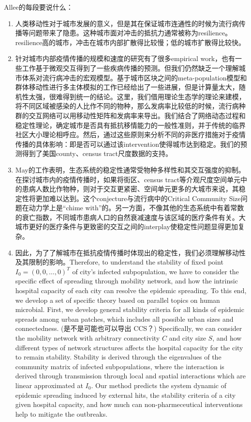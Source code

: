 Allee的每段要说什么：\begin{enumerate}
    \item 人类移动性对于城市发展的意义，但是其在保证城市连通性的时候为流行病传播等问题带来了隐患。这种城市面对冲击的抵抗力通常被称为resilience。resilience高的城市，冲击在城市内部扩散得比较慢；低的城市扩散得比较快。
    \item 针对城市内部疫情传播的规模和速度的研究有了很多empirical work，也有一些工作基于微观交互得到了一些疾病传播的预测。但我们仍然缺乏一个理解城市体系对流行病冲击的宏观模型。基于城市区块之间的meta-population模型和群体移动性进行多主体模拟的工作已经给出了一些进展，但是计算量太大，随机性太强，很难得到统一的结论。这里，我们借用理论生态学的理论来建模，将不同区域被感染的人比作不同的物种，那么发病率比较低的时候，流行病种群的交互网络可以用移动性矩阵和发病率来导出。我们结合了网络动态过程和稳定性理论，确定城市是否具有抵抗移情能力的一般性准则，并于传统的临界社区大小理论相呼应。然后，通过这些原则来分析不同的非医疗措施对于疫情传播的具体影响：即是否可以通过该intervention使得城市达到稳定。我们的预测得到了美国county、census tract尺度数据的支持。
    \item May的工作表明，生态系统的稳定性通常受物种多样性和其交互强度的抑制。在探讨城市内的疫情传播时，如果将街区、census tract等介观尺度空间单元中的患病人数比作物种，则对于交互更紧密、空间单元更多的大城市来说，其稳定性将更加难以达到。这个conjecture与流行病中的Critical Community Size问题在动力学上是“chime with”的。另一方面，不像其他的生态系统中有着常数的衰亡指数，不同城市患病人口的自然衰减速度与该区域的医疗条件有关。大城市更好的医疗条件与更致密的交互之间的interplay使稳定性问题显得更加复杂。
    \item 因此，为了了解城市在抵抗疫情传播时体现出的稳定性，我们必须理解移动性及其限制的影响。Therefore, to understand the stability of fixed point $I_0 = (0,0,\dots,0)^T$ of city’s infected subpopulation, we have to consider the specific effect of spreading through mobility network, and how the intrinsic hospital capacity of each city can resolve the epidemic spreading. To this end, we develop a set of specific theory based on parallel topics on human microbial. First, we develop general stability criteria for all kinds of epidemic spreads among urban patches, which includes all possible urban sizes and connectedness. (是不是可能也可以导出 CCS？) Specifically, we can consider the mobility network with arbitrary connectivity $C$ and city size $S$, and how different types of network structures affects the hospital capacity for the city to remain stability. Stability is derived through the eigenvalues of the community matrix of infected subpopulations, where the interaction is derived through transmission through local and spatial interactions which are linear approximated at $I_0$. Our method predicts the system dynamic of epidemic spreading induced by external hits, the stability criteria of a city given hospital capacity, and how much can non-pharmeceutical interventions help to mitigate the outbreaks.

\end{enumerate}
